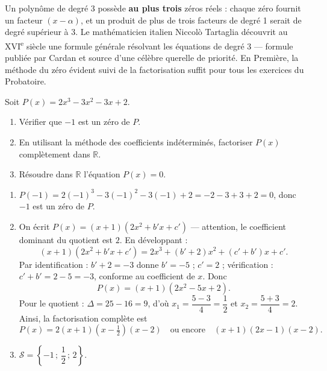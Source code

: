 \documentclass[11pt]{article}
\begin{document}
\begin{savaistu}
Un polynôme de degré 3 possède \textbf{au plus trois} zéros réels : chaque zéro fournit un facteur $(x - \alpha)$, et un produit de plus de trois facteurs de degré 1 serait de degré supérieur à 3. Le mathématicien italien Niccolò Tartaglia découvrit au XVI\textsuperscript{e} siècle une formule générale résolvant les équations de degré 3 — formule publiée par Cardan et source d'une célèbre querelle de priorité. En Première, la méthode du zéro évident suivi de la factorisation suffit pour tous les exercices du Probatoire.
\end{savaistu}

\begin{exercice}
Soit $P(x) = 2x^3 - 3x^2 - 3x + 2$.
\begin{enumerate}
\item Vérifier que $-1$ est un zéro de $P$.
\item En utilisant la méthode des coefficients indéterminés, factoriser $P(x)$ complètement dans $\mathbb{R}$.
\item Résoudre dans $\mathbb{R}$ l'équation $P(x) = 0$.
\end{enumerate}
\end{exercice}

\begin{corrige}
\begin{enumerate}
\item $P(-1) = 2(-1)^3 - 3(-1)^2 - 3(-1) + 2 = -2 - 3 + 3 + 2 = 0$, donc $-1$ est un zéro de $P$.
\item On écrit $P(x) = (x + 1)(2x^2 + b'x + c')$ — attention, le coefficient dominant du quotient est $2$. En développant :
\[ (x+1)(2x^2 + b'x + c') = 2x^3 + (b' + 2)x^2 + (c' + b')x + c'. \]
Par identification : $b' + 2 = -3$ donne $b' = -5$ ; $c' = 2$ ; vérification : $c' + b' = 2 - 5 = -3$, conforme au coefficient de $x$. Donc
\[ P(x) = (x + 1)(2x^2 - 5x + 2). \]
Pour le quotient : $\Delta = 25 - 16 = 9$, d'où $x_1 = \dfrac{5 - 3}{4} = \dfrac{1}{2}$ et $x_2 = \dfrac{5 + 3}{4} = 2$. Ainsi, la factorisation complète est
\[ P(x) = 2(x + 1)\left(x - \tfrac{1}{2}\right)(x - 2) \quad \text{ou encore} \quad (x+1)(2x-1)(x-2). \]
\item $\mathcal{S} = \left\{-1 \,;\, \dfrac{1}{2} \,;\, 2\right\}$.
\end{enumerate}
\end{corrige}
\end{document}
